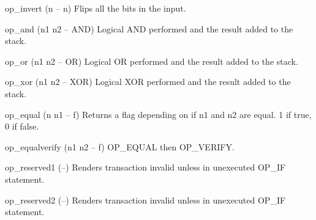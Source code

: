 \documentclass[a4paper, 11pt, openany]{book}
\begin{document}
\begin{forthbox}
  op_invert       (n -- n)
                  Flips all the bits in the input.

  op_and          (n1 n2 -- AND)
                  Logical AND performed and the result added to
                  the stack.

  op_or           (n1 n2 -- OR)
                  Logical OR performed and the result added to
                  the stack.

  op_xor          (n1 n2 -- XOR)
                  Logical XOR performed and the result added to
                  the stack.

  op_equal        (n n1 -- f)
                  Returns a flag depending on if n1 and n2 are
                  equal. 1 if true, 0 if false.

  op_equalverify  (n1 n2 -- f)
                  OP_EQUAL then OP_VERIFY.

  op_reserved1    (--)
                  Renders transaction invalid unless in
                  unexecuted OP_IF statement.

  op_reserved2    (--)
                  Renders transaction invalid unless in
                  unexecuted OP_IF statement.
\end{forthbox}
\end{document}
